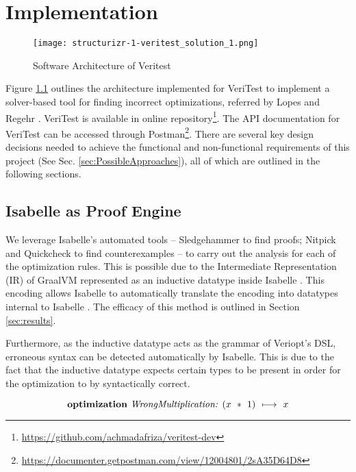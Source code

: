 \chapter{Implementation \label{sec:implementation}}

\begin{figure}[!htb]
    \centering
    \texttt{[image: structurizr-1-veritest\_solution\_1.png]}
    \caption{Software Architecture of Veritest}
    \label{fig:architecture}
\end{figure}

Figure \ref{fig:architecture} outlines the architecture implemented for VeriTest to implement a solver-based tool for finding incorrect optimizations,
referred by Lopes and Regehr \cite[p. 5]{CompilerOptimization}. 
VeriTest is available in online repository\footnote{\href{https://github.com/achmadafriza/veritest-dev}{https://github.com/achmadafriza/veritest-dev}}. 
The API documentation for VeriTest can be 
accessed through Postman\footnote{\href{https://documenter.getpostman.com/view/12004801/2sA35D64D8}{https://documenter.getpostman.com/view/12004801/2sA35D64D8}}.
There are several key design decisions needed to achieve the functional and 
non-functional requirements of this project (See Sec. \ref{sec:PossibleApproaches}), all of which are outlined in the following sections.

\section{Isabelle as Proof Engine}
\label{sec:ProofEngine}

We leverage Isabelle's automated tools -- Sledgehammer to find proofs; Nitpick and Quickcheck to find counterexamples --
to carry out the analysis for each of the optimization rules. This is possible due to the Intermediate 
Representation (IR) of GraalVM represented as an inductive datatype inside Isabelle \cite[Sec. 3]{ATVA21_GraalVM_IR_Semantics}. 
This encoding allows Isabelle to automatically translate the encoding into datatypes internal to Isabelle \cite{biendarra_ning_2024}.
The efficacy of this method is outlined in Section \ref{sec:results}.

Furthermore, as the inductive datatype acts as the grammar of Veriopt's DSL, erroneous syntax can be detected automatically by Isabelle.
This is due to the fact that the inductive datatype expects certain types to be present in order for the optimization to by syntactically correct.

\begin{equation}
    \text{\textbf{optimization} \emph{WrongMultiplication: \((x\ *\ 1)\ \longmapsto\ x\)}}
    \label{eq:MalformedRule}
\end{equation}

